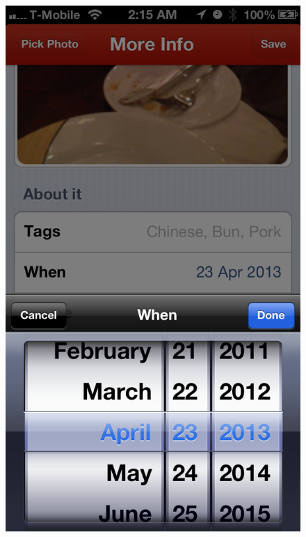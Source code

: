 \begin{figure}
{	\includegraphics[width=\figwidth, totalheight=\figheight, keepaspectratio]{./screenshots/home-when.png}} \hfill \\
\end{figure}
